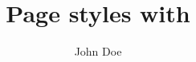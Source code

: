 \documentclass[twoside]{scrartcl}
\begin{document}
\title{Page styles with \KOMAScript}
\author{John Doe}
\maketitle
\lipsum
\lipsum
\end{document}
